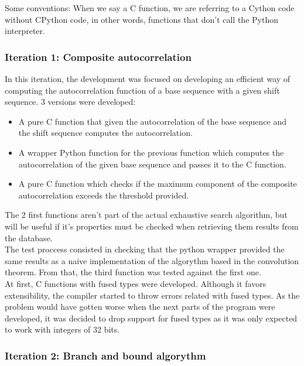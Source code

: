       Some conventions: When we say a C function, we are referring to a Cython
      code without CPython code, in other words, functions that don't call
      the Python interpreter.

      \subsubsection{Iteration 1: Composite autocorrelation}

      In this iteration, the development was focused on developing an efficient
      way of computing the autocorrelation function of a base sequence with a
      given shift sequence. 3 versions were developed:
      \begin{itemize}
        \item A pure C function that given the autocorrelation of the base
        sequence and the shift sequence computes the autocorrelation.
        \item A wrapper Python function for the previous function which
        computes the autocorrelation of the given base sequence and passes it
        to the C function.
        \item A pure C function which checks if the maximum component of the
        composite autocorrelation exceeds the threshold provided.
      \end{itemize}

      The 2 first functions aren't part of the actual exhaustive search
      algorithm, but will be useful if it's properties
      must be checked when retrieving them results from the database. \\

      The test proccess consisted in checking that the python wrapper provided
      the same results as a naive implementation of the algorythm based in
      the convolution theorem. From that, the third function was tested against the
      first one.\\

      At first, C functions with fused types were developed. Although it
      favors extensibility, the compiler started to throw errors related with
      fused types. As the problem would have gotten worse when the next parts of
      the program were developed, it was decided to drop support for fused types
      as it was only expected to work with integers of 32 bits.\\

      \subsubsection{Iteration 2: Branch and bound algorythm}

